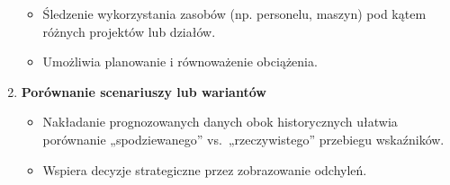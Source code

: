 \documentclass[
  polish,
  letterpaper,
  DIV=11,
  numbers=noendperiod]{scrreprt}
\providecommand{\tightlist}{%
  \setlength{\itemsep}{0pt}\setlength{\parskip}{0pt}}
\begin{document}
\begin{enumerate}
  \begin{itemize}
  \tightlist
  \item
    Śledzenie wykorzystania zasobów (np. personelu, maszyn) pod kątem
    różnych projektów lub działów.\\
  \item
    Umożliwia planowanie i równoważenie obciążenia.
  \end{itemize}
\item
  \textbf{Porównanie scenariuszy lub wariantów}

  \begin{itemize}
  \tightlist
  \item
    Nakładanie prognozowanych danych obok historycznych ułatwia
    porównanie „spodziewanego'' vs.~„rzeczywistego'' przebiegu
    wskaźników.\\
  \item
    Wspiera decyzje strategiczne przez zobrazowanie odchyleń.
  \end{itemize}
\end{enumerate}
\end{document}
